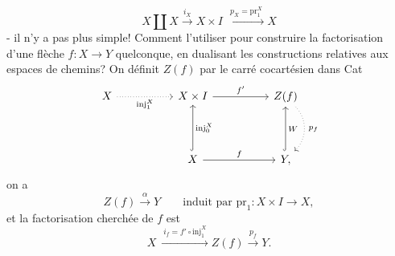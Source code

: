 \[
X \amalg X \xrightarrow{i_X} X \times I \ \xrightarrow{\ p_X = \mathrm{pr}_1^X\ } X
\]
- il n'y a pas plus simple! Comment l'utiliser pour construire la factorisation d'une flèche $f : X \longrightarrow Y$ quelconque, en dualisant les constructions relatives aux espaces de chemins? On définit $Z(f)$ par le carré cocartésien dans Cat
\[
\begin{tikzcd}[column sep=5em, row sep=4em]
X \arrow[r, dotted, "\mathrm{inj}_1^X"'] & X \times I \arrow[r, "f'"] & Z(f) \arrow[d, dotted, bend left=45, "\,p_f"] \\
& X \arrow[u, hook, "\mathrm{inj}_0^X"'] \arrow[r, "f"] & Y, \arrow[u, hook, "W"']
\end{tikzcd}
\]
on a
\[
Z(f) \xrightarrow{\alpha} Y \qquad \text{induit par } \mathrm{pr}_1 : X \times I \longrightarrow X,
\]
et la factorisation cherchée de $f$ est
\[
X \ \xrightarrow{\ i_f = f' \circ \mathrm{inj}_1^X\ } Z(f) \xrightarrow{p_f} Y.
\]

